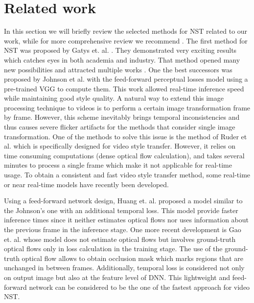 \documentclass[a4paper,conference]{IEEEtran}
\begin{document}

  
\section{Related work}


In this section we will briefly review the selected methods for NST related to our work, while for more comprehensive review we recommend \cite{NeuralStyleTransferReview}.  The first method for NST was proposed by Gatys et. al. \cite{Gatys2016ImageST}. They demonstrated very exciting results which catches eyes in both academia and industry. That method opened many new possibilities and attracted multiple works \cite{JohnsonAL16,DumoulinSK16,Champandard16,LuanPSB17,GatysEBHS16}. One the best successors was proposed by Johnson et al. \cite{JohnsonAL16} with the feed-forward perceptual losses model using a pre-trained VGG \cite{Simonyan15} to compute them. This work allowed real-time inference speed while maintaining good style quality.  A natural way to extend this image processing technique to videos is to perform a certain image transformation frame by frame. However, this scheme inevitably brings temporal inconsistencies and thus causes severe flicker artifacts for the methods that consider single image transformation. One of the methods to solve this issue is the method of Ruder et al. \cite{RuderDB16} which is specifically designed for video style transfer. However, it relies on time consuming computations (dense optical flow calculation), and takes several minutes to process a single frame which make it not applicable for real-time usage. To obtain a consistent and fast video style transfer method, some real-time or near real-time models have recently been developed. 

Using a feed-forward network design, Huang et. al. \cite{Huang_2017_CVPR} proposed a model similar to the Johnson's one  \cite{JohnsonAL16} with an additional temporal loss. This model provide faster inference times since it neither estimates optical flows nor uses information about the previous frame in the inference stage.  One more recent development is  Gao et. al. \cite{Reconet} whose model does not estimate optical flows but involves ground-truth optical flows only in loss calculation in the training stage. The use of the ground-truth optical flow allows to obtain occlusion mask which marks regions that are unchanged in between frames. Additionally, temporal loss is considered not only on output image but also at the feature level of DNN. This lightweight and feed-forward network can be considered to be the one of the fastest approach for video NST. 
\end{document}
